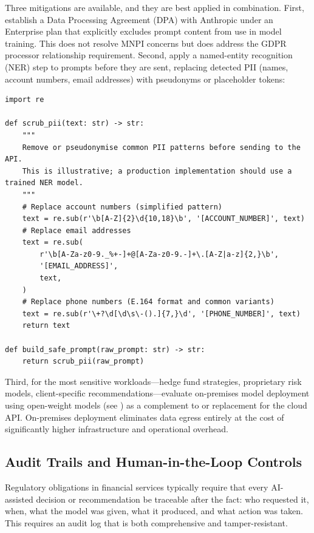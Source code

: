 Three mitigations are available, and they are best applied in combination. First,
establish a Data Processing Agreement (DPA) with Anthropic under an Enterprise plan
that explicitly excludes prompt content from use in model training. This does not
resolve MNPI concerns but does address the GDPR processor relationship requirement.
Second, apply a named-entity recognition (NER) step to prompts before they are sent,
replacing detected PII (names, account numbers, email addresses) with pseudonyms or
placeholder tokens:

\begin{verbatim}
import re

def scrub_pii(text: str) -> str:
    """
    Remove or pseudonymise common PII patterns before sending to the API.
    This is illustrative; a production implementation should use a trained NER model.
    """
    # Replace account numbers (simplified pattern)
    text = re.sub(r'\b[A-Z]{2}\d{10,18}\b', '[ACCOUNT_NUMBER]', text)
    # Replace email addresses
    text = re.sub(
        r'\b[A-Za-z0-9._%+-]+@[A-Za-z0-9.-]+\.[A-Z|a-z]{2,}\b',
        '[EMAIL_ADDRESS]',
        text,
    )
    # Replace phone numbers (E.164 format and common variants)
    text = re.sub(r'\+?\d[\d\s\-().]{7,}\d', '[PHONE_NUMBER]', text)
    return text

def build_safe_prompt(raw_prompt: str) -> str:
    return scrub_pii(raw_prompt)
\end{verbatim}

Third, for the most sensitive workloads---hedge fund strategies, proprietary risk
models, client-specific recommendations---evaluate on-premises model deployment using
open-weight models (see ) as a complement to or
replacement for the cloud API. On-premises deployment eliminates data egress entirely
at the cost of significantly higher infrastructure and operational overhead.

\subsection{Audit Trails and Human-in-the-Loop Controls}
\label{app:sdk-commercial:security:audit}

Regulatory obligations in financial services typically require that every AI-assisted
decision or recommendation be traceable after the fact: who requested it, when, what
the model was given, what it produced, and what action was taken. This requires an
audit log that is both comprehensive and tamper-resistant.


